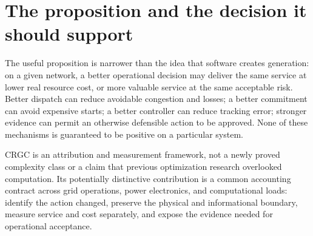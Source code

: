 \documentclass[11pt,letterpaper]{article}
\begin{document}
\begin{abstract}
Computationally recoverable grid capability (CRGC) denotes a measured improvement in electrical service or resource cost attributable to a computational intervention under an explicit operational contract. We separate improvements in physical dispatch, feasible-set information, policy design, verification, and hardware. This distinction prevents congestion payments, electrical losses, reserve requirements, unserved energy, and capacity accreditation from being combined into a fictitious additive resource. A critical review connects arithmetic complexity, AC relaxations, unit commitment, model predictive control, formal verification, and large-load storage without assuming a new universal solver. We reconstruct the Billion-Dollar Napkin's arithmetic and identify the unsupported causal assumptions behind its national totals. We report reproducible experiments, including a stronger comparator that eliminates the apparent optimization-specific benefit in constructed battery scenarios. The resulting research program is falsifiable: benefit must survive strong baselines, independent feasibility checks, equal information and resource budgets, uncertainty, adverse operating conditions, and a separately defined economic accounting boundary. The paper provides a bounded literature and source audit, explicit upper bounds, a claim-evidence map, and a staged evaluation protocol. It does not establish national recoverable TWh, firm MW, commercial savings, or a production-ready controller.
\end{abstract}
\tableofcontents\newpage{}
\section{The proposition and the decision it should support}
\label{sec:proposition}
The useful proposition is narrower than the idea that software creates generation: on a given network, a better operational decision may deliver the same service at lower real resource cost, or more valuable service at the same acceptable risk. Better dispatch can reduce avoidable congestion and losses; a better commitment can avoid expensive starts; a better controller can reduce tracking error; stronger evidence can permit an otherwise defensible action to be approved. None of these mechanisms is guaranteed to be positive on a particular system.

CRGC is an attribution and measurement framework, not a newly proved complexity class or a claim that previous optimization research overlooked computation. Its potentially distinctive contribution is a common accounting contract across grid operations, power electronics, and computational loads: identify the action changed, preserve the physical and informational boundary, measure service and cost separately, and expose the evidence needed for operational acceptance.
\end{document}
